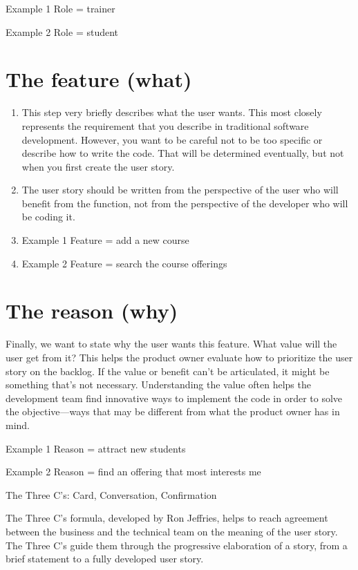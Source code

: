             Example 1 Role = trainer

            Example 2 Role = student

\section{The feature (what)}
\begin{enumerate}
    \item This step very briefly describes what the user wants. This most closely represents the requirement that you describe in traditional software development. However, you want to be careful not to be too specific or describe how to write the code. That will be determined eventually, but not when you first create the user story.
    \item The user story should be written from the perspective of the user who will benefit from the function, not from the perspective of the developer who will be coding it.

    \item Example 1 Feature = add a new course

    \item Example 2 Feature = search the course offerings
\end{enumerate}
 
\section{The reason (why)}

Finally, we want to state why the user wants this feature. What value will the user get from it? This helps the product owner evaluate how to prioritize the user story on the backlog. If the value or benefit can’t be articulated, it might be something that’s not necessary. Understanding the value often helps the development team find innovative ways to implement the code in order to solve the objective—ways that may be different from what the product owner has in mind.

\item Example 1 Reason = attract new students

\item Example 2 Reason = find an offering that most interests me

\item The Three C's: Card, Conversation, Confirmation
\item The Three C's formula, developed by Ron Jeffries, helps to reach agreement between the business and the technical team on the meaning of the user story. The Three C's guide them through the progressive elaboration of a story, from a brief statement to a fully developed user story.

